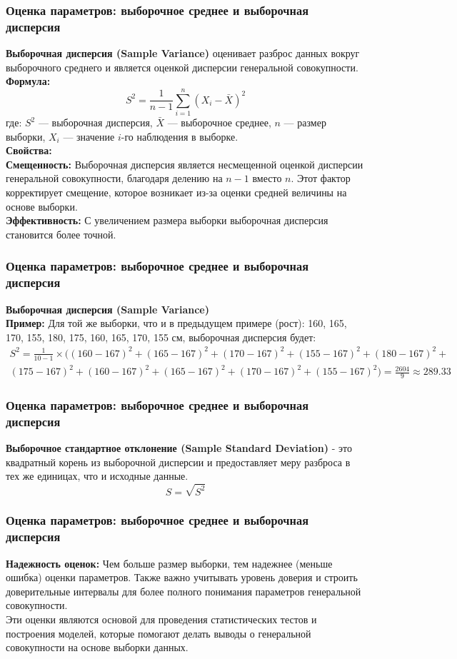\documentclass[aspectratio=169]{beamer}
\begin{document}
\begin{frame}
\frametitle{Оценка параметров: выборочное среднее и выборочная дисперсия}
{\bf Выборочная дисперсия (Sample Variance)} оценивает разброс данных вокруг выборочного среднего и является оценкой дисперсии генеральной совокупности.\\
{\bf Формула:}
  \[
  S^2 = \frac{1}{n - 1} \sum_{i=1}^{n} (X_i - \bar{X})^2
  \]
где: \( S^2 \) — выборочная дисперсия, \( \bar{X} \) — выборочное среднее, \( n \) — размер выборки, \( X_i \) — значение \( i \)-го наблюдения в выборке.\\
{\bf Свойства:}\\
{\bf Смещенность:} Выборочная дисперсия является несмещенной оценкой дисперсии генеральной совокупности, благодаря делению на \( n - 1 \) вместо \( n \). Этот фактор корректирует смещение, которое возникает из-за оценки средней величины на основе выборки.\\
{\bf Эффективность:} С увеличением размера выборки выборочная дисперсия становится более точной.
\end{frame}

\begin{frame}
\frametitle{Оценка параметров: выборочное среднее и выборочная дисперсия}
{\bf Выборочная дисперсия (Sample Variance)}\\
{\bf Пример:} Для той же выборки, что и в предыдущем примере (рост): 160, 165, 170, 155, 180, 175, 160, 165, 170, 155 см, выборочная дисперсия будет:
\begin{multline*}
S^2 = \frac{1}{10 - 1}\times((160 - 167)^2 + (165 - 167)^2 + (170 - 167)^2 + (155 - 167)^2 + (180 - 167)^2 +\\ (175 - 167)^2 + (160 - 167)^2 + (165 - 167)^2 + (170 - 167)^2 + (155 - 167)^2) = \frac{2604}{9} \approx 289.33
\end{multline*}
\end{frame}

\begin{frame}
\frametitle{Оценка параметров: выборочное среднее и выборочная дисперсия}
{\bf Выборочное стандартное отклонение (Sample Standard Deviation)} - это квадратный корень из выборочной дисперсии и предоставляет меру разброса в тех же единицах, что и исходные данные.
  \[
  S = \sqrt{S^2}
  \]
\end{frame}

\begin{frame}
\frametitle{Оценка параметров: выборочное среднее и выборочная дисперсия}
{\bf Надежность оценок:} Чем больше размер выборки, тем надежнее (меньше ошибка) оценки параметров. Также важно учитывать уровень доверия и строить доверительные интервалы для более полного понимания параметров генеральной совокупности.
\newline\\
Эти оценки являются основой для проведения статистических тестов и построения моделей, которые помогают делать выводы о генеральной совокупности на основе выборки данных.
\end{frame}
\end{document}

